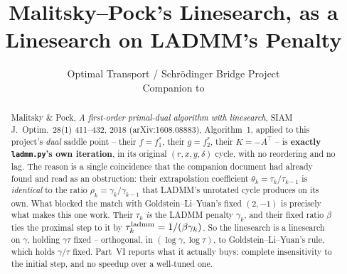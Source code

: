 \documentclass[11pt]{article}
\title{Malitsky--Pock's Linesearch, as a Linesearch on LADMM's Penalty}
\author{Optimal Transport / Schr\"odinger Bridge Project\\
Companion to \code{adaptive\_pdhg\_goldstein.tex}}
\date{}
\newcommand{\code}[1]{\texttt{#1}}
\begin{document}
\maketitle

\begin{abstract}
Malitsky \& Pock, \emph{A first-order primal-dual algorithm with linesearch},
SIAM J.\ Optim.\ 28(1) 411--432, 2018 (arXiv:1608.08883), Algorithm~1, applied
to this project's \emph{dual} saddle point -- their $f=f_1^*$, their $g=f_2^*$,
their $K=-A^\top$ -- is \textbf{exactly \code{ladmm.py}'s own iteration}, in its
original $(r,x,y,\delta)$ cycle, with no reordering and no lag. The reason is a
single coincidence that the companion document had already found and read as an
obstruction: their extrapolation coefficient $\theta_k=\tau_k/\tau_{k-1}$ is
\emph{identical} to the ratio $\rho_k=\gamma_k/\gamma_{k-1}$ that LADMM's
unrotated cycle produces on its own. What blocked the match with
Goldstein--Li--Yuan's fixed $(2,-1)$ is precisely what makes this one work.
Their $\tau_k$ \emph{is} the LADMM penalty $\gamma_k$, and their fixed ratio
$\beta$ ties the proximal step to it by $\tau^{\rm ladmm}_k=1/(\beta\gamma_k)$.
So the linesearch is a linesearch on $\gamma$, holding $\gamma\tau$ fixed --
orthogonal, in $(\log\gamma,\log\tau)$, to Goldstein--Li--Yuan's rule, which
holds $\gamma/\tau$ fixed. Part~VI reports what it actually buys: complete
insensitivity to the initial step, and no speedup over a well-tuned one.
\end{abstract}
\end{document}
